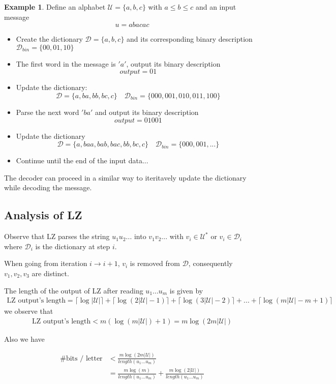 \documentclass{article}
\theoremstyle{definition} %
\newtheorem{example}{Example}
\def\D{\mathcal{D}}
\def\U{\mathcal{U}}
\begin{document}
\begin{example}
  Define an alphabet $\U = \{a, b, c\}$ with $a \leq b \leq c$ and an input message
  $$ u = a b a c a c $$
  \begin{itemize}
    \item Create the dictionary $\D = \{a, b, c\}$ and its corresponding binary description $\D_{bin} = \{00, 01, 10\}$
    \item The first word in the message is $'a'$, output its binary description
    $$ output = 01 $$
    \item Update the dictionary:
    $$ \D = \{a, ba, bb, bc , c\} \quad \D_{bin} = \{000, 001, 010, 011, 100\} $$
    \item Parse the next word $'ba'$ and output its binary description
    $$ output = 01 001 $$
    \item Update the dictionary
    $$ \D = \{a, baa, bab, bac, bb, bc , c\} \quad \D_{bin} = \{000, 001, ...\} $$
    \item Continue until the end of the input data...
  \end{itemize}
  The decoder can proceed in a similar way to iteritavely update the dictionary while decoding the message.
\end{example}

\subsection{Analysis of LZ}

Observe that LZ parses the string $u_1 u_2 ...$ into $v_1 v_2 ...$ with $v_i \in \U^*$ or $v_i \in \D_i$ where $\D_i$ is the dictionary at step $i$.

When going from iteration $i \rightarrow i+1$, $v_i$ is removed from $\D$, consequently $v_1, v_2, v_3$ are distinct.

The length of the output of LZ after reading $u_1 ... u_m$ is given by
\begin{align*}
  \text{LZ output's length} = \lceil \log |\U| \rceil + \lceil \log (2 |\U| - 1) \rceil
  + \lceil \log (3 |\U| - 2) \rceil + ...
  + \lceil \log (m|\U| - m + 1) \rceil
\end{align*}
we observe that
\begin{align*}
  \text{LZ output's length} < m(\log(m |\U|) + 1) = m \log(2 m |\U|)
\end{align*}

Also we have

\begin{align*}
  \text{\# bits / letter} &< \frac{m \log(2m |\U|)}{length(u_1 ... u_m)} \\
  &= \frac{m \log(m)}{ length(u_1 ... u_m)} + \frac{m \log(2 |\U|)}{length(u_1 ... u_m)}
\end{align*}
\end{document}
